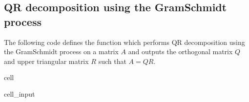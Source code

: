 \documentclass[letterpaper,10pt,english]{jupyterBook}
\begin{document}
\subsection{QR decomposition using the Gram\sphinxhyphen{}Schmidt process}
\label{\detokenize{8_Appendices/8.1_Python:qr-decomposition-using-the-gram-schmidt-process}}
\sphinxAtStartPar
The following code defines the function  which performs QR decomposition using the Gram\sphinxhyphen{}Schmidt process on a matrix \(A\) and outputs the orthogonal matrix \(Q\) and upper triangular matrix \(R\) such that \(A = QR\).

\begin{sphinxuseclass}{cell}\begin{sphinxVerbatimInput}

\begin{sphinxuseclass}{cell_input}
\begin{sphinxVerbatim}[commandchars=\\\{\}]
 
       
         
       
           
            \PYG{p}{[}\PYG{p}{]}  \PYG{p}{[}\PYG{p}{]} \PYG{p}{[}\PYG{p}{]}
            \PYG{p}{[}\PYG{p}{]}  \PYG{p}{[}\PYG{p}{]}  \PYG{p}{[}\PYG{p}{]}  \PYG{p}{[}\PYG{p}{]}
            
        \PYG{p}{[}\PYG{p}{]}  \PYG{p}{[}\PYG{p}{]}  \PYG{p}{[}\PYG{p}{]}
        \PYG{p}{[}\PYG{p}{]}  \PYG{p}{[}\PYG{p}{]}
        \PYG{p}{[}\PYG{p}{]}  \PYG{p}{[}\PYG{p}{]}  \PYG{p}{[}\PYG{p}{]}
    

\end{sphinxVerbatim}
\end{sphinxuseclass}
\end{sphinxVerbatimInput}
\end{sphinxuseclass}
\end{document}

